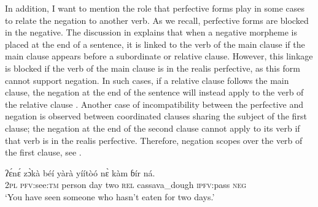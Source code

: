 \documentclass[output=paper,colorlinks=true, citecolor=brown]{langscibook}
\begin{document}
In addition, I want to mention the role that perfective forms play in some cases to relate the negation to another verb. As we recall, perfective forms are blocked in the negative. 
The discussion in  explains that when a negative morpheme is placed at the end of a sentence, it is linked to the verb of the main clause if the main clause appears before a subordinate or relative clause. However, this linkage is blocked if the verb of the main clause is in the realis perfective, as this form cannot support negation. In such cases, if a relative clause follows the main clause, the negation at the end of the sentence will instead apply to the verb of the relative clause . Another case of incompatibility between the perfective and negation is observed between coordinated clauses sharing the subject of the first clause; the negation at the end of the second clause cannot apply to its verb if that verb is in the realis perfective.
Therefore, negation scopes over the verb of the first clause, see .



\ea\label{ex:gba:82}
    \gll ʔɛ́nɛ́ zɔ̀kà béí yàrà yíítòó nɛ̀ kàm ɓír ná. \\ 
         \textsc{2pl} \textsc{pfv}:see:\textsc{tm} person day two \textsc{rel} cassava\_dough \textsc{ipfv}:pass \textsc{neg} \\
    \glt ‘You have seen someone who hasn’t eaten for two days.’
\z 
\end{document}
